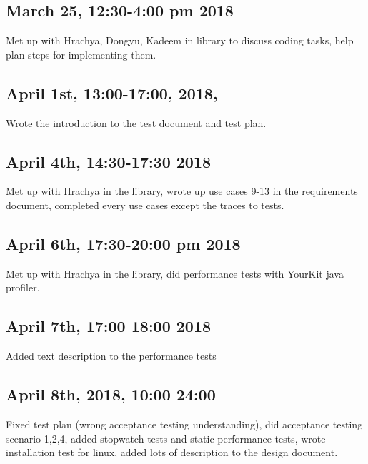 \documentclass[12pt]{article}
\begin{document}
\maketitle

\subsection*{March 25, 12:30-4:00 pm 2018}
Met up with Hrachya, Dongyu, Kadeem in library to discuss coding tasks, help plan steps for implementing them. 

\subsection*{April 1st, 13:00-17:00, 2018, }
Wrote the introduction to the test document and test plan.

\subsection*{April 4th, 14:30-17:30 2018}
 Met up with Hrachya in the library, wrote up use cases 9-13 in the requirements document, completed every use cases except the traces to tests.

\subsection*{April 6th, 17:30-20:00 pm 2018}
Met up with Hrachya in the library, did performance tests with YourKit java profiler.

\subsection*{April 7th, 17:00 18:00 2018}
Added text description to the performance tests

\subsection*{April 8th,  2018, 10:00 24:00}
Fixed test plan (wrong acceptance testing understanding), did acceptance testing scenario 1,2,4, added stopwatch tests and static performance tests, wrote installation test for linux, added lots of description to the design document.
\end{document}
